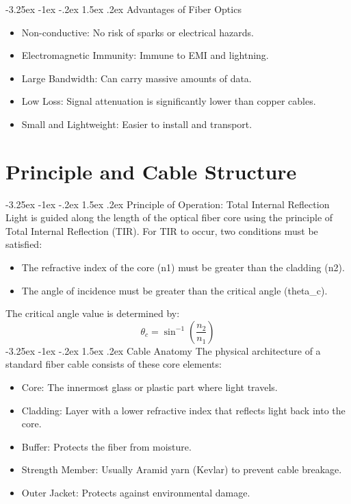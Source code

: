 \documentclass[11pt,a4paper]{report}
\makeatletter
\renewcommand{\section}{\@startsection{section}{1}{\z@}%
  {-3.25ex \@plus -1ex \@minus -.2ex}%
  {1.5ex \@plus.2ex}%
  {\normalfont\Large\bfseries\color{primaryColor}}}
\makeatother
\begin{document}
\section{Advantages of Fiber Optics}
\begin{itemize}
  \item Non-conductive: No risk of sparks or electrical hazards.
  \item Electromagnetic Immunity: Immune to EMI and lightning.
  \item Large Bandwidth: Can carry massive amounts of data.
  \item Low Loss: Signal attenuation is significantly lower than copper cables.
  \item Small and Lightweight: Easier to install and transport.
\end{itemize}
\chapter{Principle and Cable Structure}
\section{Principle of Operation: Total Internal Reflection}
Light is guided along the length of the optical fiber core using the principle of Total Internal Reflection (TIR). For TIR to occur, two conditions must be satisfied:
\begin{itemize}
  \item The refractive index of the core (n1) must be greater than the cladding (n2).
  \item The angle of incidence must be greater than the critical angle (theta\_c).
\end{itemize}
The critical angle value is determined by:
\begin{equation}\theta_c = \sin^{-1}\left( \frac{n_2}{n_1} \right)\end{equation}
\section{Cable Anatomy}
The physical architecture of a standard fiber cable consists of these core elements:
\begin{itemize}
  \item Core: The innermost glass or plastic part where light travels.
  \item Cladding: Layer with a lower refractive index that reflects light back into the core.
  \item Buffer: Protects the fiber from moisture.
  \item Strength Member: Usually Aramid yarn (Kevlar) to prevent cable breakage.
  \item Outer Jacket: Protects against environmental damage.
\end{itemize}
\end{document}
